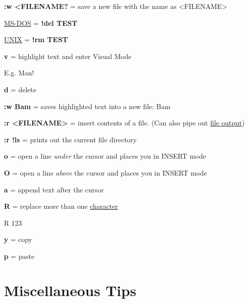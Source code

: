 \documentclass[12pt, letterpaper]{article}
\begin{document}
\begin{flushleft}
\textbf{:w <FILENAME?} = save a new file with the name as <FILENAME> \\
\par

\underline{MS-DOS} = \textbf{!del TEST} \par
\underline{UNIX} = \textbf{!rm TEST} \\
\par

\textbf{v} = highlight text and enter Visual Mode \\
\par
E.g. Man!  \\
\par
\textbf{d} = delete \\
\par
\textbf{:w Bam} = saves highlighted text into a new file: Bam \\
\par

\textbf{:r <FILENAME>} = insert contents of a file. (Can also pipe out \underline{file output}) \\
\par

\textbf{:r !ls} = prints out the current file directory \\
\par

\textbf{o} = open a line \textit{under} the cursor and places you in INSERT mode \\
\par

\textbf{O} = open a line \textit{above} the cursor and places you in INSERT mode \\
\par

\textbf{a} = append text after the cursor \\
\par

\textbf{R} = replace more than one \underline{character} \\
\par

R 123 

\textbf{y} = copy \\
\par

\textbf{p} = paste \\
\par

\section{Miscellaneous Tips}


\end{flushleft}
\end{document}
